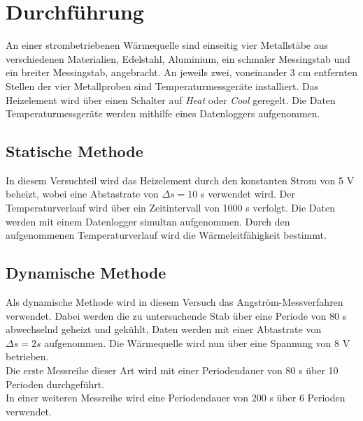 \section{Durchführung}
\label{sec:Durchführung}
An einer strombetriebenen Wärmequelle sind einseitig vier Metallstäbe aus verschiedenen 
Materialien, Edelstahl, Aluminium, ein schmaler Messingstab und ein breiter Messingstab, 
angebracht. An jeweils zwei, voneinander 3 cm entfernten Stellen der vier Metallproben sind 
Temperaturmessgeräte installiert. Das Heizelement wird über einen Schalter auf \textit{Heat}
oder \textit{Cool} geregelt. Die Daten Temperaturmessgeräte werden
mithilfe eines Datenloggers aufgenommen.


\subsection{Statische Methode}
    In diesem Versuchteil wird das Heizelement
    durch den konstanten Strom von 5 V beheizt, wobei eine Abstastrate von $\Delta s= 10$ s verwendet wird. Der Temperaturverlauf
    wird über ein Zeitintervall von 1000 s 
    verfolgt. Die Daten werden mit einem Datenlogger simultan aufgenommen. 
    Durch den aufgenommenen Temperaturverlauf wird die Wärmeleitfähigkeit bestimmt.

\subsection{Dynamische Methode}
    Als dynamische Methode wird in diesem Versuch das Angström-Messverfahren verwendet. Dabei werden
    die zu untersuchende Stab über eine Periode von 80 s abwechselnd geheizt und gekühlt, Daten werden mit einer Abtastrate von $\Delta s = 2s$ aufgenommen.
    Die Wärmequelle wird nun über eine Spannung von 8 V betrieben.\\
    Die erste Messreihe dieser Art wird mit einer Periodendauer von 80 s über 
    10 Perioden durchgeführt.\\
    In einer weiteren Messreihe wird eine Periodendauer von 200 s über 6 Perioden verwendet.
